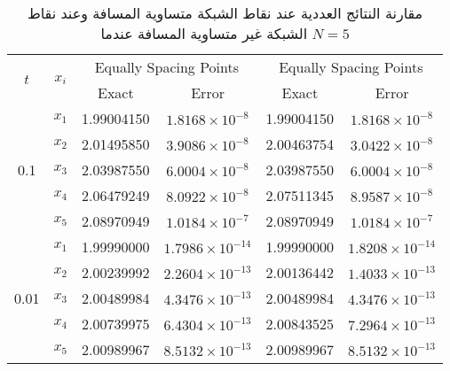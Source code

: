 \begin{example}
	\begin{table}[H]
		\renewcommand{\arraystretch}{1.5}
		\centering
		\begin{english}
\begin{tabular}{|c|c|c|c|c|c|}
			\hline
			\multirow{2}{*}{\( t \)} & \multirow{2}{*}{\( x_i \)} & \multicolumn{2}{c|}{Equally Spacing Points} & \multicolumn{2}{c|}{Equally Spacing Points} \\
			\cline{3-6}
			& & Exact & Error & Exact & Error \\
			\hline
			\multirow{5}{*}{0.1} & \( x_1 \) & 1.99004150 & \( 1.8168 \times 10^{-8} \) & 1.99004150 & \( 1.8168 \times 10^{-8} \) \\
			& \( x_2 \) & 2.01495850 & \( 3.9086 \times 10^{-8} \) & 2.00463754 & \( 3.0422 \times 10^{-8} \) \\
			& \( x_3 \) & 2.03987550 & \( 6.0004 \times 10^{-8} \) & 2.03987550 & \( 6.0004 \times 10^{-8} \) \\
			& \( x_4 \) & 2.06479249 & \( 8.0922 \times 10^{-8} \) & 2.07511345 & \( 8.9587 \times 10^{-8} \) \\
			& \( x_5 \) & 2.08970949 & \( 1.0184 \times 10^{-7} \) & 2.08970949 & \( 1.0184 \times 10^{-7} \) \\
			\hline
			\multirow{5}{*}{0.01} & \( x_1 \) & 1.99990000 & \( 1.7986 \times 10^{-14} \) & 1.99990000 & \( 1.8208 \times 10^{-14} \) \\
			& \( x_2 \) & 2.00239992 & \( 2.2604 \times 10^{-13} \) & 2.00136442 & \( 1.4033 \times 10^{-13} \) \\
			& \( x_3 \) & 2.00489984 & \( 4.3476 \times 10^{-13} \) & 2.00489984 & \( 4.3476 \times 10^{-13} \) \\
			& \( x_4 \) & 2.00739975 & \( 6.4304 \times 10^{-13} \) & 2.00843525 & \( 7.2964 \times 10^{-13} \) \\
			& \( x_5 \) & 2.00989967 & \( 8.5132 \times 10^{-13} \) & 2.00989967 & \( 8.5132 \times 10^{-13} \) \\
			\hline
		\end{tabular}
\end{english}
	\caption{\centering مقارنة النتائج العددية عند نقاط الشبكة متساوية المسافة وعند نقاط الشبكة غير متساوية المسافة عندما $N=5$}
\label{tab:secondN5}
\end{table}
	

\end{example}

